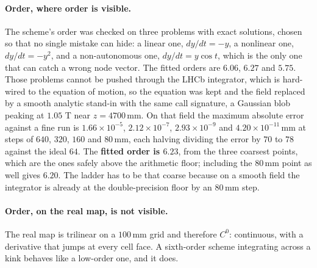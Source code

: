 \documentclass[11pt,a4paper]{article}
\newcommand{\mm}{\ensuremath{\,\mathrm{mm}}}
\begin{document}
\paragraph{Order, where order is visible.} The scheme's order was checked on
three problems with exact solutions, chosen so that no single mistake can hide: a
linear one, $dy/dt = -y$, a nonlinear one, $dy/dt = -y^{2}$, and a
non-autonomous one, $dy/dt = y\cos t$, which is the only one that can catch a
wrong node vector. The fitted orders are $6.06$, $6.27$ and $5.75$. Those
problems cannot be pushed through the LHCb integrator, which is hard-wired to
the equation of motion, so the equation was kept and the field replaced by a
smooth analytic stand-in with the same call signature, a Gaussian blob peaking at
$1.05$ T near $z = 4700\mm$. On that field the maximum absolute error against a
fine run is $1.66 \times 10^{-5}$, $2.12 \times 10^{-7}$, $2.93 \times 10^{-9}$
and $4.20 \times 10^{-11}\mm$ at steps of $640$, $320$, $160$ and $80\mm$,
each halving dividing the error by $70$ to $78$ against the ideal $64$. The
\textbf{fitted order is $6.23$}, from the three coarsest points, which are the
ones safely above the arithmetic floor; including the $80\mm$ point as well
gives $6.20$. The ladder has to be that coarse because on a smooth field the
integrator is already at the double-precision floor by an $80\mm$ step.

\paragraph{Order, on the real map, is not visible.} The real map is trilinear on
a $100\mm$ grid and therefore $C^0$: continuous, with a derivative that jumps at
every cell face. A sixth-order scheme integrating across a kink behaves like a
low-order one, and it does.
\end{document}
